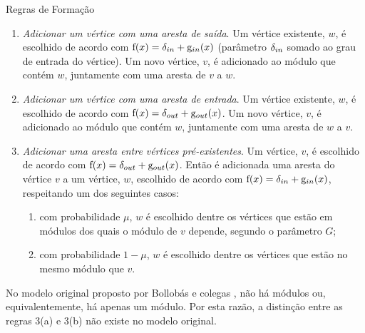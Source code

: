 \begin{section}{Regras de Formação}
\begin{enumerate}
\item \emph{Adicionar um vértice com uma aresta de saída}. Um vértice existente, $w$, é escolhido de acordo com $\mathrm{f}(x) = \delta_{in} + \mathrm{g}_{in}(x)$ (parâmetro $\delta_{in}$ somado ao grau de entrada do vértice). Um novo vértice, $v$, é adicionado ao módulo que contém $w$, juntamente com uma aresta de $v$ a $w$.

\item \emph{Adicionar um vértice com uma aresta de entrada}. Um vértice existente, $w$, é escolhido de acordo com $\mathrm{f}(x) = \delta_{out} + \mathrm{g}_{out}(x)$. Um novo vértice, $v$, é adicionado ao módulo que contém $w$, juntamente com uma aresta de $w$ a $v$.

\item \emph{Adicionar uma aresta entre vértices pré-existentes}. Um vértice, $v$, é escolhido de acordo com $\mathrm{f}(x) = \delta_{out} + \mathrm{g}_{out}(x)$. Então é adicionada uma aresta do vértice $v$ a um vértice, $w$, escolhido de acordo com $\mathrm{f}(x) = \delta_{in} + \mathrm{g}_{in}(x)$, respeitando um dos seguintes casos:

\begin{enumerate}
  \item com probabilidade $\mu$, $w$ é escolhido dentre os vértices que estão em módulos dos quais o módulo de $v$ depende, segundo o parâmetro $G$;
  \item com probabilidade $1 - \mu$, $w$ é escolhido dentre os vértices que estão no mesmo módulo que $v$.
\end{enumerate}

\end{enumerate}

No modelo original proposto por Bollobás e colegas \cite{Bollobas2003}, não há módulos ou, equivalentemente, há apenas um módulo. Por esta razão, a distinção entre as regras 3(a) e 3(b) não existe no modelo original.

\end{section}

